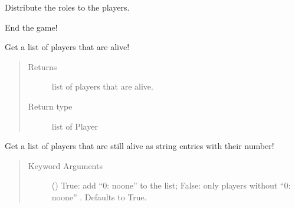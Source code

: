 \documentclass[letterpaper,10pt,english]{sphinxmanual}
\begin{document}
\begin{fulllineitems}
\begin{fulllineitems}
\label{\detokenize{chatwolf:chatwolf.game.Game.dist_roles}}
Distribute the roles to the players.

\end{fulllineitems}


\begin{fulllineitems}
\label{\detokenize{chatwolf:chatwolf.game.Game.end}}
End the game!

\end{fulllineitems}


\begin{fulllineitems}
\label{\detokenize{chatwolf:chatwolf.game.Game.get_alive}}
Get a list of players that are alive!
\begin{quote}\begin{description}
\item[{Returns}] \leavevmode
list of players that are alive.

\item[{Return type}] \leavevmode
list of Player

\end{description}\end{quote}

\end{fulllineitems}


\begin{fulllineitems}
\label{\detokenize{chatwolf:chatwolf.game.Game.get_alive_string}}
Get a list of players that are still alive as string entries with their number!
\begin{quote}\begin{description}
\item[{Keyword Arguments}] \leavevmode
{} (\sphinxstyleliteralemphasis{\sphinxupquote{, }}) \textendash{} True: add “0: noone” to the list; False: only players without “0: noone”  . Defaults to True.


\end{description}
\end{quote}
\end{fulllineitems}
\end{fulllineitems}
\end{document}
